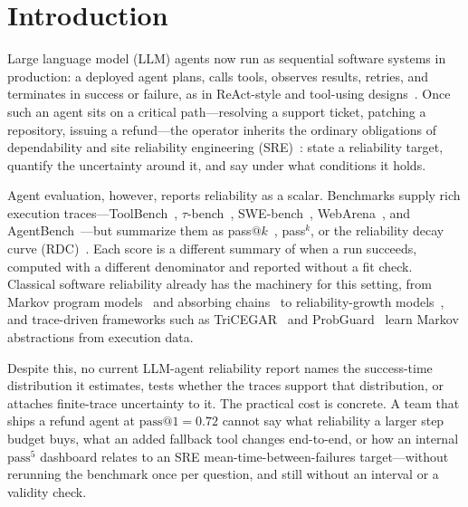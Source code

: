 \section{Introduction}
\label{sec:intro}

Large language model (LLM) agents now run as sequential software
systems in production: a deployed agent plans, calls tools, observes
results, retries, and terminates in success or failure, as in
ReAct-style and tool-using
designs~\cite{yao2023react,schick2023toolformer,wang2024agentsurvey}.
Once such an agent sits on a critical path---resolving a support
ticket, patching a repository, issuing a refund---the operator inherits
the ordinary obligations of dependability and site reliability
engineering (SRE)~\cite{avizienis2004dependability,beyer2016sre}:
state a reliability target, quantify the uncertainty around it, and say
under what conditions it holds.

Agent evaluation, however, reports reliability as a scalar. Benchmarks
supply rich execution traces---ToolBench~\cite{qin2023toolllm},
$\tau$-bench~\cite{taub2024}, SWE-bench~\cite{swebench2024},
WebArena~\cite{zhou2023webarena}, and
AgentBench~\cite{agentbench2024}---but summarize them as
pass$@k$~\cite{chen2021codex}, pass$^k$, or the reliability decay curve
(RDC)~\cite{rdc2025}. Each score is a different summary of when a run
succeeds, computed with a different denominator and reported without a
fit check. Classical software reliability already has the machinery for
this setting, from Markov program models~\cite{cheung1980} and
absorbing chains~\cite{kemenysnell} to reliability-growth
models~\cite{goelokt,musa1987}, and trace-driven frameworks such as
TriCEGAR~\cite{tricegar2026} and ProbGuard~\cite{pro2guard2025} learn
Markov abstractions from execution data.

Despite this, no current LLM-agent reliability report names the
success-time distribution it estimates, tests whether the traces
support that distribution, or attaches finite-trace uncertainty to it.
The practical cost is concrete. A team that ships a refund agent at
$\mathrm{pass}@1 = 0.72$ cannot say what reliability a larger step
budget buys, what an added fallback tool changes end-to-end, or how an
internal $\mathrm{pass}^5$ dashboard relates to an SRE
mean-time-between-failures target---without rerunning the benchmark
once per question, and still without an interval or a validity check.

